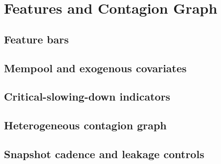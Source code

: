 \section{Features and Contagion Graph}\label{sec:features}

\subsection{Feature bars}\label{sec:feat-bars}

\subsection{Mempool and exogenous covariates}\label{sec:feat-exog}

\subsection{Critical-slowing-down indicators}\label{sec:feat-csd}

\subsection{Heterogeneous contagion graph}\label{sec:feat-graph}

\subsection{Snapshot cadence and leakage controls}\label{sec:feat-snapshots}
